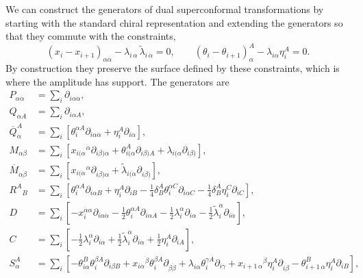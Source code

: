 \documentclass[12pt]{article}
\def \be  {\begin{equation}}
\def \ee  {\end{equation}}
\renewcommand{\a}{\alpha}
\begin{document}
{We can construct the generators of dual superconformal transformations by starting with the standard
chiral representation and extending the generators so that they commute with the constraints,
\be
(x_i-x_{i+1})_{\a \dot\alpha}  - \lambda_{i\, \a}\, \tilde{\lambda}_{i\, \dot\alpha} = 0, \qquad (\theta_i - \theta_{i+1})_\alpha^A - \lambda_{i \alpha} \eta_i^A = 0.
\ee
By construction they preserve the surface defined by these constraints, which is where the amplitude
has support. The generators are
\begin{align}
P_{\alpha \dot{\alpha}}&= \sum_i \partial_{i \alpha \dot{\alpha}},\\
Q_{\alpha A} &= \sum_i \partial_{i \alpha A}, \\
\overline{Q}_{\dot{\alpha}}^A &= \sum_i [\theta_i^{\alpha A}
  \partial_{i \alpha \dot{\alpha}} + \eta_i^A \partial_{i \dot{\alpha}}],\label{barQfss}\\
M_{\alpha \beta} &= \sum_i[x_{i ( \alpha}{}^{\dot{\alpha}}
  \partial_{i \beta ) \dot{\alpha}} + \theta_{i (\alpha}^A \partial_{i
  \beta) A} + \lambda_{i (\alpha} \partial_{i \beta)}],\\
\overline{M}_{\dot{\alpha} \dot{\beta}} &= \sum_i [x_{i
    (\dot{\alpha}}{}^{\alpha} \partial_{i \dot{\beta} ) \alpha} +
  \tilde{\lambda}_{i(\dot{\alpha}} \partial_{i \dot{\beta})}],\\
R^{A}{}_{B} &= \sum_i [\theta_i^{\alpha A} \partial_{i \alpha B} +
  \eta_i^A \partial_{i B} - \tfrac{1}{4} \delta^A_B \theta_i^{\alpha
    C} \partial_{i \alpha C} - \tfrac{1}{4}\delta^A_B \eta_i^C \partial_{i C}
],\\ \label{DD} D &= \sum_i [-x_i^{\dot{\alpha}\alpha}\partial_{i \alpha \dot{\alpha}} -
  \tfrac{1}{2} \theta_i^{\alpha A} \partial_{i \alpha A} -
  \tfrac{1}{2} \lambda_i^{\alpha} \partial_{i \alpha} -\tfrac{1}{2}
  \tilde{\lambda}_i^{\dot{\alpha}} \partial_{i \dot{\alpha}}],\\
  \label{CC}
C &=  \sum_i [-\tfrac{1}{2}\lambda_i^{\alpha} \partial_{i \alpha} +
  \tfrac{1}{2}\tilde{\lambda}_i^{\dot{\alpha}} \partial_{i \dot{\alpha}} + \tfrac{1}{2}\eta_i^A
  \partial_{i A}], \\
S_{\alpha}^A &= \sum_i [-\theta_{i \alpha}^{B} \theta_i^{\beta A}
  \partial_{i \beta B} + x_{i \alpha}{}^{\dot{\beta}} \theta_i^{\beta
    A} \partial_{\beta \dot{\beta}} + \lambda_{i \alpha}
  \theta_{i}^{\gamma A} \partial_{i \gamma} + x_{i+1\,
    \alpha}{}^{\dot{\beta}} \eta_i^A \partial_{i \dot{\beta}} -
  \theta_{i+1\, \alpha}^B \eta_i^A \partial_{i B}],\\

\end{align}}
\end{document}
